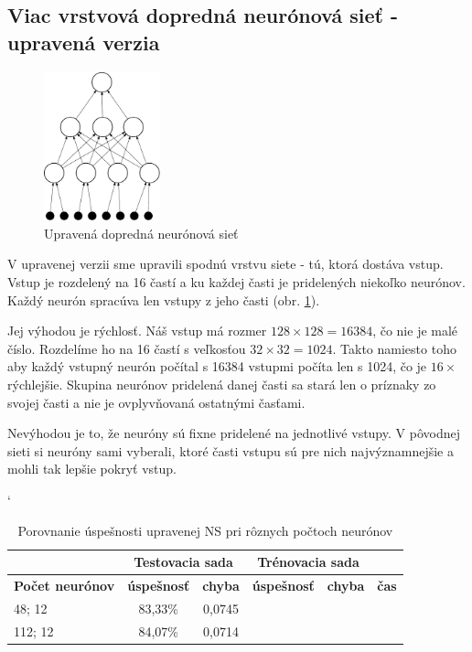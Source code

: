 \subsection{Viac vrstvová dopredná neurónová sieť - upravená verzia}

\begin{figure}[h]
  \begin{center}
    \includegraphics[width=0.3\textwidth]{images/dffnn}
  \end{center}
  \caption{Upravená dopredná neurónová sieť}
  \label{fig:dffnn}
\end{figure}


V upravenej verzii sme upravili spodnú vrstvu siete - tú, ktorá dostáva vstup. Vstup je rozdelený na 16 častí a ku každej časti je pridelených niekoľko neurónov. Každý neurón spracúva len vstupy z jeho časti (obr. \ref{fig:dffnn}). 

Jej výhodou je rýchlosť. Náš vstup má rozmer $128\times 128 = 16384$, čo nie je malé číslo. Rozdelíme ho na 16 častí s veľkosťou $32\times 32 = 1024$. Takto namiesto toho aby každý vstupný neurón počítal s 16384 vstupmi počíta len s 1024, čo je $16\times$ rýchlejšie. Skupina neurónov pridelená danej časti sa stará len o príznaky zo svojej časti a nie je ovplyvňovaná ostatnými časťami. 

Nevýhodou je to, že neuróny sú fixne pridelené na jednotlivé vstupy. V pôvodnej sieti si neuróny sami vyberali, ktoré časti vstupu sú pre nich najvýznamnejšie a mohli tak lepšie pokryť vstup.

\begin{table}[h]
\catcode` %
\centering
\begin{tabular}{|l|c|c|c|c|c|}
\cline{2-5}
\multicolumn{1}{l}{} & \multicolumn{2}{|c|}{\textbf{Testovacia sada}} & \multicolumn{2}{c|}{\textbf{Trénovacia sada}} & \multicolumn{1}{l}{}\\ 
\hline
\textbf{Počet neurónov} & \textbf{úspešnosť} & \textbf{chyba} & \textbf{úspešnosť} & \textbf{chyba} & \textbf{čas} \\ \hline
48; 12 & 83,33\% & 0,0745 & & &\\ \hline
112; 12 & 84,07\% & 0,0714 & & &\\
\hline
\end{tabular}
\caption{Porovnanie úspešnosti upravenej NS pri rôznych počtoch neurónov}
\label{tab:neuroncountcmp2}
\end{table}

